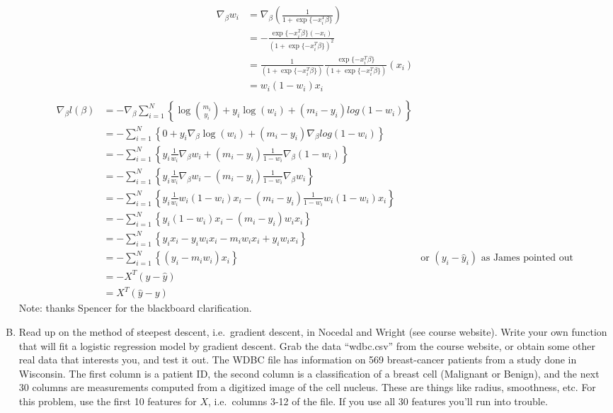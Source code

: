 \documentclass{article}
\begin{document}
\begin{enumerate}[(A)]
\color{blue}
\begin{align*}
\nabla_\beta w_i 
&= \nabla_\beta \left(\frac{1}{1 + \exp\{-x_i^T \beta\}} \right)\\
&= -\frac{\exp\{-x_i^T \beta\}(-x_i)}{(1 + \exp\{-x_i^T \beta\})^2}  \\
&= \frac{1}{(1 + \exp\{-x_i^T \beta\})}\frac{\exp\{-x_i^T \beta\}}{(1 + \exp\{-x_i^T \beta\})}  (x_i)\\
&= w_i(1-w_i)x_i \\
\end{align*}
\begin{align*}
\nabla_\beta l(\beta) 
&= - \nabla_\beta  \sum_{i=1}^N  \left \{ \log\binom{m_i}{y_i} + y_i\log(w_i) + (m_i-y_i)log(1-w_i) \right \} \\
&= -  \sum_{i=1}^N  \left \{0 + y_i\nabla_\beta \log(w_i) + (m_i-y_i)\nabla_\beta log(1-w_i) \right \} \\
&= -  \sum_{i=1}^N  \left \{y_i \frac{1}{w_i} \nabla_\beta w_i + (m_i-y_i)\frac{1}{1-w_i}\nabla_\beta (1-w_i) \right \} \\
&= -  \sum_{i=1}^N  \left \{ y_i \frac{1}{w_i} \nabla_\beta w_i - (m_i-y_i)\frac{1}{1-w_i}\nabla_\beta w_i \right \} \\
&= -  \sum_{i=1}^N  \left \{ y_i \frac{1}{w_i} w_i(1-w_i)x_i  - (m_i-y_i)\frac{1}{1-w_i}w_i(1-w_i)x_i  \right \} \\
&= -  \sum_{i=1}^N  \left \{ y_i (1-w_i)x_i  - (m_i-y_i)w_ix_i  \right \} \\
&= -  \sum_{i=1}^N  \left \{ y_ix_i-y_iw_ix_i  -m_iw_ix_i +y_iw_ix_i  \right \} \\
&= -  \sum_{i=1}^N  \left \{ (y_i  -m_iw_i)x_i  \right \} & \text{or $(y_i - \hat{y}_i)$ as James pointed out}\\
&= - X^T(y-\hat y)\\
&= X^T(\hat y- y)
\end{align*}
Note: thanks Spencer for the blackboard clarification. 
\color{black}

\item Read up on the method of steepest descent, i.e.~gradient descent, in Nocedal and Wright (see course website).  Write your own function that will fit a logistic regression model by gradient descent.  Grab the data ``wdbc.csv'' from the course website, or obtain some other real data that interests you, and test it out.  The WDBC file has information on 569 breast-cancer patients from a study done in Wisconsin.  The first column is a patient ID, the second column is a classification of a breast cell (Malignant or Benign), and the next 30 columns are measurements computed from a digitized image of the cell nucleus.  These are things like radius, smoothness, etc.  For this problem, use the first 10 features for $X$, i.e.~columns 3-12 of the file.  If you use all 30 features you'll run into trouble.


\end{enumerate}
\end{document}
